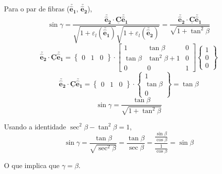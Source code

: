 \begin{enumerate}
    Para o par de fibras ($\utilde{\mathbf{\hat{e}_1}}$, $\utilde{\mathbf{\hat{e}_2}}$),
    \[
        \sin\gamma=\frac{\utilde{\mathbf{\hat{e}_2}}\cdot\underline{\mathbf{C}}\utilde{\mathbf{\hat{e}_1}}}{\sqrt{1+\varepsilon_l(\utilde{\mathbf{\hat{e}_1}})}\sqrt{1+\varepsilon_l(\utilde{\mathbf{\hat{e}_2}})}}
        =
        \frac{\utilde{\mathbf{\hat{e}_2}}\cdot\underline{\mathbf{C}}\utilde{\mathbf{\hat{e}_1}}}{\sqrt{1+\tan^2\beta}}		
    \]
    \[
        \utilde{\mathbf{\hat{e}_2}}\cdot\underline{\mathbf{C}}\utilde{\mathbf{\hat{e}_1}}
        =
        \begin{Bmatrix}
            0 & 1 & 0
        \end{Bmatrix}
        \cdot
        \begin{bmatrix}
            1 & \tan\beta & 0 \\
            \tan\beta & \tan^2\beta + 1 & 0 \\
            0 & 0 & 1
        \end{bmatrix}
        \begin{Bmatrix}
            1 \\ 0 \\ 0
        \end{Bmatrix}
    \]
    \[
        \utilde{\mathbf{\hat{e}_2}}\cdot\underline{\mathbf{C}}\utilde{\mathbf{\hat{e}_1}}
        =
        \begin{Bmatrix}
            0 & 1 & 0
        \end{Bmatrix}
        \cdot
        \begin{Bmatrix}
            1 \\ \tan\beta \\ 0
        \end{Bmatrix}
        =\tan\beta
    \]
    \[
        \sin\gamma=\frac{\tan\beta}{\sqrt{1+\tan^2\beta}}
    \]
    
    Usando a identidade $\sec^2\beta-\tan^2\beta=1$,
    \[
        \sin\gamma=\frac{\tan\beta}{\sqrt{\sec^2\beta}}=\frac{\tan\beta}{\sec\beta}=\frac{\displaystyle\frac{\sin\beta}{\cos\beta}}{\displaystyle\frac{1}{\cos\beta}}=\sin\beta		
    \]
    
    O que implica que $\gamma=\beta$.
    

\end{enumerate}

